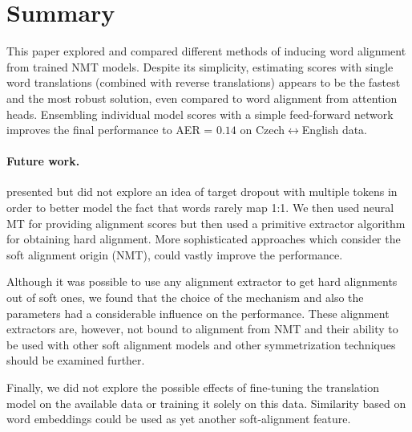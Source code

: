 \section{Summary}
\vspace{-0.1cm}

This paper explored and compared different methods of inducing word alignment from trained NMT models.
Despite its simplicity, estimating scores with single word translations (combined with reverse translations) appears to be the fastest and the most robust solution, even compared to word alignment from attention heads.
Ensembling individual model scores with a simple feed-forward network improves the final performance to AER = $0.14$ on Czech$\leftrightarrow$English data.

\vspace{-0.3cm}
\paragraph{Future work.}

 presented but did not explore an idea of target dropout with multiple tokens in order to better model the fact that words rarely map 1:1.
We then used neural MT for providing alignment scores but then used a primitive extractor algorithm for obtaining hard alignment. More sophisticated approaches which consider the soft alignment origin (NMT), could vastly improve the performance.

Although it was possible to use any alignment extractor to get hard alignments out of soft ones, we found that the choice of the mechanism and also the parameters had a considerable influence on the performance. These alignment extractors are, however, not bound to alignment from NMT and their ability to be used with other soft alignment models and other symmetrization techniques should be examined further.

Finally, we did not explore the possible effects of fine-tuning the translation model on the available data or training it solely on this data. Similarity based on word embeddings could be used as yet another soft-alignment feature.